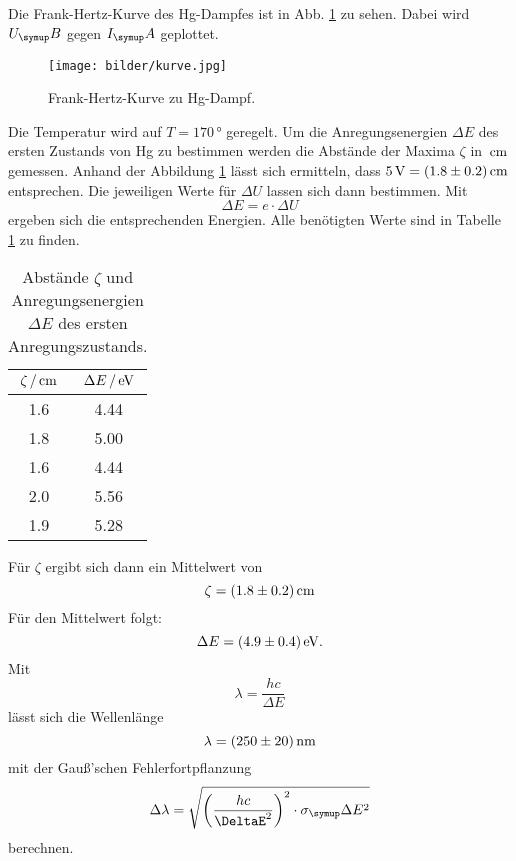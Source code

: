 Die Frank-Hertz-Kurve des Hg-Dampfes ist in Abb. \ref{fig:kurve} zu sehen.
Dabei wird $U_\su{B}$ gegen $I_\su{A}$ geplottet.
\begin{figure}
  \centering
  \texttt{[image: bilder/kurve.jpg]}
  \caption{Frank-Hertz-Kurve zu Hg-Dampf.}
  \label{fig:kurve}
\end{figure}
Die Temperatur wird auf $T=170\,\si{\degree}$ geregelt. Um die Anregungsenergien
$\Delta E$
des ersten Zustands von Hg zu bestimmen werden die Abstände der Maxima $\zeta$ in
$\,\si{\centi\meter}$ gemessen. Anhand der Abbildung \ref{fig:kurve} lässt sich ermitteln,
dass $5\,\si{\volt} = (1.8\pm0.2)\,\si{\centi\meter}$ entsprechen. Die jeweiligen Werte für $\Delta U$
lassen sich dann bestimmen. Mit
\begin{equation}
  \Delta E = e\cdot \Delta U
\end{equation}
ergeben sich die entsprechenden Energien. Alle benötigten Werte sind in Tabelle
\ref{tab:werte} zu finden.
\begin{table}
  \centering
  \begin{tabular}{c c}
    \toprule
    $\zeta \,/\,\si{\centi\meter}$   & $\Delta E \,/\,\si{\electronvolt}$  \\
    \midrule
    1.6 & 4.44 \\
    1.8 & 5.00 \\
    1.6 & 4.44 \\
    2.0 & 5.56 \\
    1.9 & 5.28 \\
    \bottomrule
  \end{tabular}
  \caption{Abstände $\zeta$ und Anregungsenergien $\Delta E$ des ersten Anregungszustands.}
  \label{tab:werte}
\end{table}
Für $\zeta$ ergibt sich dann ein Mittelwert von
\begin{equation*}
  \zeta = (1.8\pm0.2)\,\si{\centi\meter}
\end{equation*}
Für den Mittelwert folgt:
\begin{equation*}
  \Delta E = (4.9 \pm 0.4) \,\si{\electronvolt}.
\end{equation*}
Mit
\begin{equation}
  \lambda = \frac{hc}{\Delta E} \label{eqn:lambda}
\end{equation}
lässt sich die Wellenlänge
\begin{equation*}
  \lambda = (250 \pm 20)\,\si{\nano\meter}
\end{equation*}
mit der Gauß'schen Fehlerfortpflanzung
\begin{equation*}
  \Delta \lambda = \sqrt{\left(\frac{hc}{\DeltaE^2}\right)^2\cdot\sigma_\su{\Delta E^2}}
\end{equation*}
berechnen.

